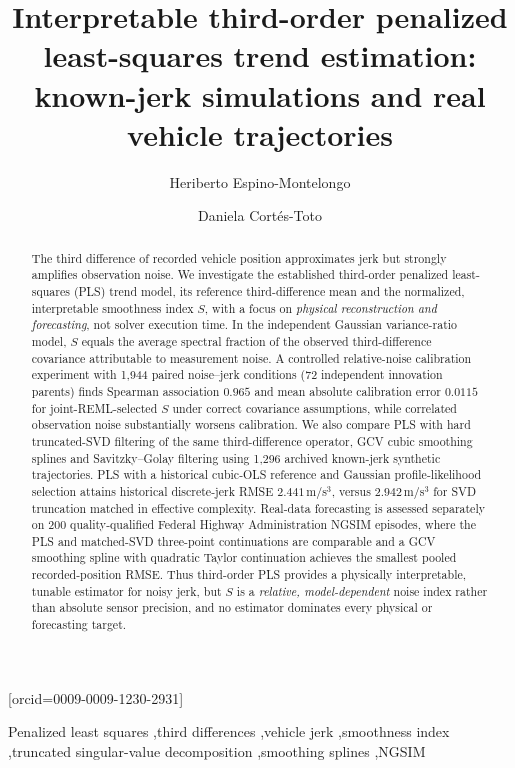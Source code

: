 \documentclass[a4paper,fleqn]{cas-dc}
\begin{document}
\let\WriteBookmarks\relax
\def\floatpagepagefraction{1}
\def\textpagefraction{.001}
\title[mode=title]{Interpretable third-order penalized least-squares trend estimation: known-jerk simulations and real vehicle trajectories}
\author[1]{Heriberto Espino-Montelongo}[orcid=0009-0009-1230-2931]
\author[1]{Daniela Cort\'es-Toto}
\begin{abstract}
The third difference of recorded vehicle position approximates jerk but strongly amplifies observation noise. We investigate the established third-order penalized least-squares (PLS) trend model, its reference third-difference mean and the normalized, interpretable smoothness index $S$, with a focus on \emph{physical reconstruction and forecasting}, not solver execution time. In the independent Gaussian variance-ratio model, $S$ equals the average spectral fraction of the observed third-difference covariance attributable to measurement noise. A controlled relative-noise calibration experiment with 1,944 paired noise--jerk conditions (72 independent innovation parents) finds Spearman association $0.965$ and mean absolute calibration error $0.0115$ for joint-REML-selected $S$ under correct covariance assumptions, while correlated observation noise substantially worsens calibration. We also compare PLS with hard truncated-SVD filtering of the same third-difference operator, GCV cubic smoothing splines and Savitzky--Golay filtering using 1,296 archived known-jerk synthetic trajectories. PLS with a historical cubic-OLS reference and Gaussian profile-likelihood selection attains historical discrete-jerk RMSE $2.441$\,m/s$^3$, versus $2.942$\,m/s$^3$ for SVD truncation matched in effective complexity. Real-data forecasting is assessed separately on 200 quality-qualified Federal Highway Administration NGSIM episodes, where the PLS and matched-SVD three-point continuations are comparable and a GCV smoothing spline with quadratic Taylor continuation achieves the smallest pooled recorded-position RMSE. Thus third-order PLS provides a physically interpretable, tunable estimator for noisy jerk, but $S$ is a \emph{relative, model-dependent} noise index rather than absolute sensor precision, and no estimator dominates every physical or forecasting target.
\end{abstract}
\begin{keywords}
Penalized least squares \sep third differences \sep vehicle jerk \sep smoothness index \sep truncated singular-value decomposition \sep smoothing splines \sep NGSIM
\end{keywords}
\maketitle








\end{document}
